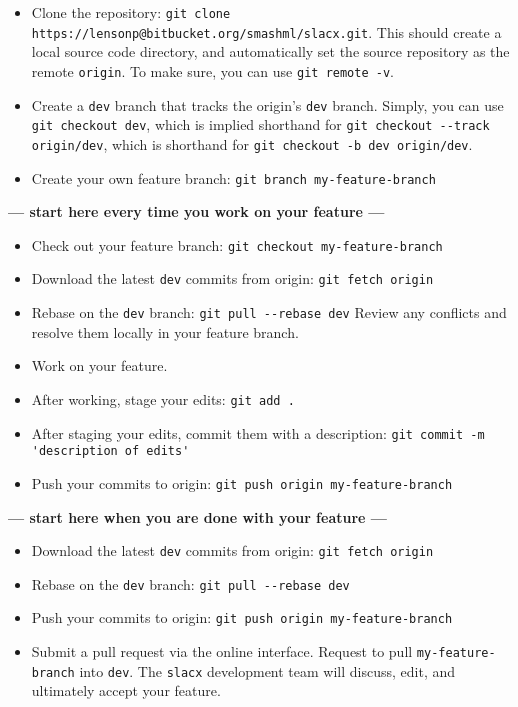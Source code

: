 \begin{itemize} 
\item Clone the repository: \verb|git clone https://lensonp@bitbucket.org/smashml/slacx.git|.
    This should create a local source code directory,
    and automatically set the source repository as the remote \verb|origin|.
    To make sure, you can use \verb|git remote -v|.
\item Create a \verb|dev| branch that tracks the origin's \verb|dev| branch.
    Simply, you can use \verb|git checkout dev|, which is implied shorthand for
    \verb|git checkout --track origin/dev|, which is shorthand for
    \verb|git checkout -b dev origin/dev|. 
\item Create your own feature branch: \verb|git branch my-feature-branch| 
\end{itemize} 
\textbf{--- start here every time you work on your feature ---}
\begin{itemize} 
\item Check out your feature branch: \verb|git checkout my-feature-branch|
\item Download the latest \verb|dev| commits from origin: \verb|git fetch origin| 
\item Rebase on the \verb|dev| branch: \verb|git pull --rebase dev|
    Review any conflicts and resolve them locally in your feature branch.
\item Work on your feature.
\item After working, stage your edits: \verb|git add .|
\item After staging your edits, commit them with a description: 
    \verb|git commit -m 'description of edits'|
\item Push your commits to origin: \verb|git push origin my-feature-branch|
\end{itemize} 
\textbf{--- start here when you are done with your feature ---}
\begin{itemize} 
\item Download the latest \verb|dev| commits from origin: \verb|git fetch origin| 
\item Rebase on the \verb|dev| branch: \verb|git pull --rebase dev|
\item Push your commits to origin: \verb|git push origin my-feature-branch|
\item Submit a pull request via the online interface.
    Request to pull \verb|my-feature-branch| into \verb|dev|.
    The \verb|slacx| development team will discuss, edit, 
    and ultimately accept your feature.
\end{itemize} 

